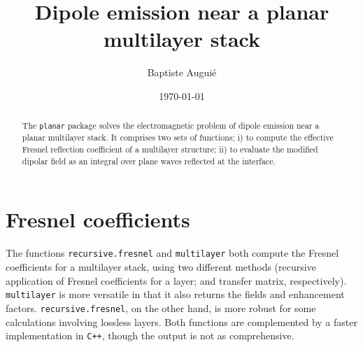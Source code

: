 \documentclass[12pt, a4paper]{article}
\title{Dipole emission near a planar multilayer stack}
\author{Baptiste Augui\'e}
\date{\today}
\begin{document}

\newcommand{\dq}{\text{d}q} 
\newcommand{\du}{\text{d}u} 

\maketitle
\begin{abstract}
The \texttt{planar} package solves the electromagnetic problem of dipole emission near a planar multilayer stack. It comprises two sets of functions; i) to compute the effective Fresnel reflection coefficient of a multilayer structure; ii) to evaluate the modified dipolar field as an integral over plane waves reflected at the interface.
\end{abstract}



\section{Fresnel coefficients}

The functions \texttt{recursive.fresnel} and \texttt{multilayer} both
compute the Fresnel coefficients for a multilayer stack, using two
different methods (recursive application of Fresnel coefficients for a
layer; and transfer matrix, respectively). \texttt{multilayer} is more versatile in that it also returns the fields and enhancement factors. \texttt{recursive.fresnel},  on the other hand, is more robust for some calculations involving lossless layers. Both functions are complemented by a faster implementation in \texttt{C++}, though the output is not as comprehensive.
%
\end{document}
